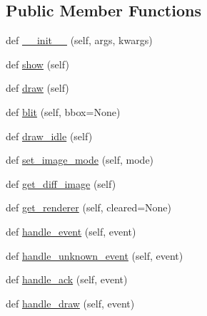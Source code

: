 \subsection*{Public Member Functions}
\begin{DoxyCompactItemize}
\item 
def \hyperlink{classmatplotlib_1_1backends_1_1backend__webagg__core_1_1FigureCanvasWebAggCore_a3e6128478c6a95c57a3410c64b33e4c5}{\+\_\+\+\_\+init\+\_\+\+\_\+} (self, args, kwargs)
\item 
def \hyperlink{classmatplotlib_1_1backends_1_1backend__webagg__core_1_1FigureCanvasWebAggCore_a5211a3f8d8b2129b09234ed6ee73d93b}{show} (self)
\item 
def \hyperlink{classmatplotlib_1_1backends_1_1backend__webagg__core_1_1FigureCanvasWebAggCore_a1cc4069987bfdd863d67c2769bb94d0f}{draw} (self)
\item 
def \hyperlink{classmatplotlib_1_1backends_1_1backend__webagg__core_1_1FigureCanvasWebAggCore_a04454fdab4cf7de6a8e5b55cce5bf81a}{blit} (self, bbox=None)
\item 
def \hyperlink{classmatplotlib_1_1backends_1_1backend__webagg__core_1_1FigureCanvasWebAggCore_abbae09954beeede376fd7388552634cb}{draw\+\_\+idle} (self)
\item 
def \hyperlink{classmatplotlib_1_1backends_1_1backend__webagg__core_1_1FigureCanvasWebAggCore_ac58dff44c28ec50b5ad078efa1352112}{set\+\_\+image\+\_\+mode} (self, mode)
\item 
def \hyperlink{classmatplotlib_1_1backends_1_1backend__webagg__core_1_1FigureCanvasWebAggCore_a8c5899961cdbcc4031054dfc88b58c32}{get\+\_\+diff\+\_\+image} (self)
\item 
def \hyperlink{classmatplotlib_1_1backends_1_1backend__webagg__core_1_1FigureCanvasWebAggCore_a11a2c4346320e913af8bc721fa70758f}{get\+\_\+renderer} (self, cleared=None)
\item 
def \hyperlink{classmatplotlib_1_1backends_1_1backend__webagg__core_1_1FigureCanvasWebAggCore_a7b66e9f7d2bc598e52c7361457f1f75f}{handle\+\_\+event} (self, event)
\item 
def \hyperlink{classmatplotlib_1_1backends_1_1backend__webagg__core_1_1FigureCanvasWebAggCore_a1578342e5e760334f0434d718bbf6f85}{handle\+\_\+unknown\+\_\+event} (self, event)
\item 
def \hyperlink{classmatplotlib_1_1backends_1_1backend__webagg__core_1_1FigureCanvasWebAggCore_a112650c413e46b5f15bde1cd523d8fa9}{handle\+\_\+ack} (self, event)
\item 
def \hyperlink{classmatplotlib_1_1backends_1_1backend__webagg__core_1_1FigureCanvasWebAggCore_ab4935c7c896d6bea41afba7f93d4fb12}{handle\+\_\+draw} (self, event)

\end{DoxyCompactItemize}
